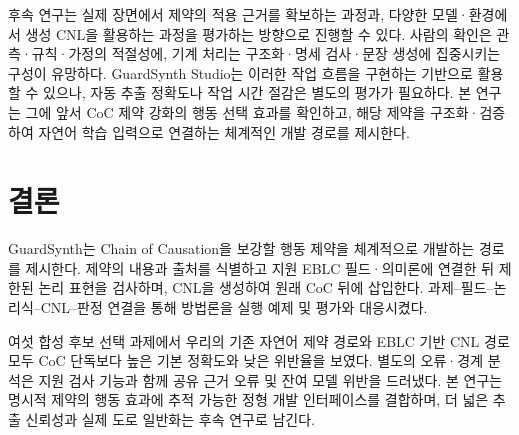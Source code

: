 \documentclass[10pt,a4paper,twocolumn]{article}\usepackage[margin=18mm]{geometry}\usepackage{fontspec,kotex}
\begin{document}
후속 연구는 실제 장면에서 제약의 적용 근거를 확보하는 과정과, 다양한 모델·환경에서 생성 CNL을 활용하는 과정을 평가하는 방향으로 진행할 수 있다. 사람의 확인은 관측·규칙·가정의 적절성에, 기계 처리는 구조화·명세 검사·문장 생성에 집중시키는 구성이 유망하다. GuardSynth Studio는 이러한 작업 흐름을 구현하는 기반으로 활용할 수 있으나, 자동 추출 정확도나 작업 시간 절감은 별도의 평가가 필요하다. 본 연구는 그에 앞서 CoC 제약 강화의 행동 선택 효과를 확인하고, 해당 제약을 구조화·검증하여 자연어 학습 입력으로 연결하는 체계적인 개발 경로를 제시한다.\par
\section{결론}

GuardSynth는 Chain of Causation을 보강할 행동 제약을 체계적으로 개발하는 경로를 제시한다. 제약의 내용과 출처를 식별하고 지원 EBLC 필드·의미론에 연결한 뒤 제한된 논리 표현을 검사하며, CNL을 생성하여 원래 CoC 뒤에 삽입한다. 과제--필드--논리식--CNL--판정 연결을 통해 방법론을 실행 예제 및 평가와 대응시켰다.\par

여섯 합성 후보 선택 과제에서 우리의 기존 자연어 제약 경로와 EBLC 기반 CNL 경로 모두 CoC 단독보다 높은 기본 정확도와 낮은 위반율을 보였다. 별도의 오류·경계 분석은 지원 검사 기능과 함께 공유 근거 오류 및 잔여 모델 위반을 드러냈다. 본 연구는 명시적 제약의 행동 효과에 추적 가능한 정형 개발 인터페이스를 결합하며, 더 넓은 추출 신뢰성과 실제 도로 일반화는 후속 연구로 남긴다.\par
\end{document}
